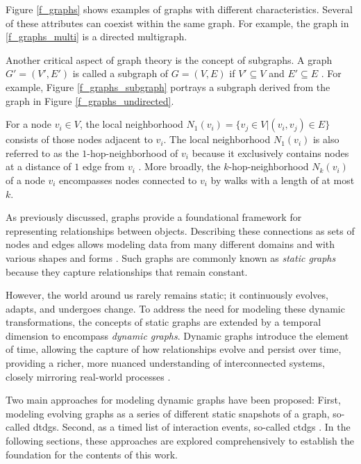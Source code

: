 Figure \ref{f_graphs} shows examples of graphs with different characteristics. Several of these attributes can coexist within the same graph. For example, the graph in \ref{f_graphs_multi} is a directed multigraph.

Another critical aspect of graph theory is the concept of subgraphs. A graph $G' = (V', E')$ is called a subgraph of $G = (V,E)$ if $V' \subseteq V$ and $E' \subseteq E$ \cite{diestel_graph_2017}. For example, Figure \ref{f_graphs_subgraph} portrays a subgraph derived from the graph in Figure \ref{f_graphs_undirected}. 


For a node $v_i \in V$, the local neighborhood $N_1(v_i) = \{v_j \in V | (v_i, v_j) \in E\}$ \cite{wu_comprehensive_2021} consists of those nodes adjacent to $v_i$. The local neighborhood $N_1(v_i)$ is also referred to as the $1$-hop-neighborhood of $v_i$ because it exclusively contains nodes at a distance of $1$ edge from $v_i$ \cite{bronstein_geometric_2021}. More broadly, the $k$-hop-neighborhood $N_k(v_i)$ of a node $v_i$ encompasses nodes connected to $v_i$ by walks with a length of at most $k$. 


As previously discussed, graphs provide a foundational framework for representing relationships between objects. Describing these connections as sets of nodes and edges allows modeling data from many different domains and with various shapes and forms \cite{bronstein_geometric_2017, kazemi_representation_2019}. Such graphs are commonly known as \textit{static graphs} \cite{kazemi_representation_2019, rossi_temporal_2020, you_roland_2022} because they capture relationships that remain constant. 

However, the world around us rarely remains static; it continuously evolves, adapts, and undergoes change. To address the need for modeling these dynamic transformations, the concepts of static graphs are extended by a temporal dimension to encompass \textit{dynamic graphs}. Dynamic graphs introduce the element of time, allowing the capture of how relationships evolve and persist over time, providing a richer, more nuanced understanding of interconnected systems, closely mirroring real-world processes \cite{you_roland_2022, xu_inductive_2020, trivedi_dyrep_2019}.

Two main approaches for modeling dynamic graphs have been proposed: First, modeling evolving graphs as a series of different static snapshots of a graph, so-called \glspl{dtdg}. Second, as a timed list of interaction events, so-called \glspl{ctdg} \cite{rossi_temporal_2020, trivedi_dyrep_2019}. In the following sections, these approaches are explored comprehensively to establish the foundation for the contents of this work.


